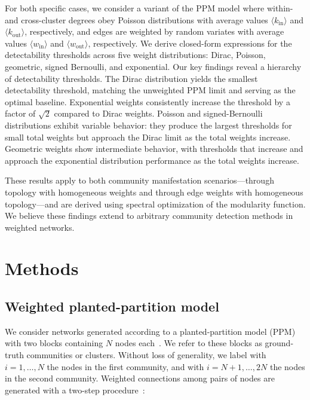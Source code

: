 \documentclass[a4paper,pre,superscriptaddress,floatfix,nofootinbib,twocolumn]{revtex4-1}
\begin{document}
For both specific cases, we consider a variant of the PPM model where within- and cross-cluster degrees obey Poisson distributions with average values $\langle k_{\text{in}} \rangle$ and $\langle k_{\text{out}} \rangle$, respectively, and edges are weighted by random variates with average values $\langle w_\text{in} \rangle$ and $\langle w_\text{out} \rangle$, respectively.
We derive closed-form expressions for the detectability thresholds across five weight distributions: Dirac, Poisson, geometric, signed Bernoulli, and exponential. Our key findings reveal a hierarchy of detectability thresholds.
The Dirac distribution yields the smallest detectability threshold, matching the unweighted PPM limit and serving as the optimal baseline. Exponential weights consistently increase the threshold by a factor of $\sqrt{2}$ compared to Dirac weights. Poisson and signed-Bernoulli distributions exhibit variable behavior: they produce the largest thresholds for small total weights but approach the Dirac limit as the total weights increase. Geometric weights show intermediate behavior, with thresholds that increase and approach the exponential distribution performance as the total weights increase.

These results apply to both community manifestation scenarios—through topology with homogeneous weights and through edge weights with homogeneous topology—and are derived using spectral optimization of the modularity function. We believe these findings extend to arbitrary community detection methods in weighted networks.
\section*{Methods}

\subsection*{Weighted planted-partition model}

We consider networks generated according to a planted-partition model (PPM) with two blocks containing $N$ nodes each~\cite{condon2001algorithms}. We refer to these blocks as ground-truth communities or clusters. Without loss of generality, we label with $i=1, \ldots, N$ the nodes in the first community, and with $i=N+1, \ldots, 2N$ the nodes in the second community.
Weighted connections among pairs of nodes are generated with a two-step procedure~\cite{aicher2014learning,peixoto2018nonparametric}:
\end{document}
